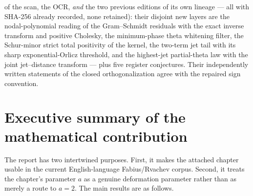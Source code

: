 \documentclass[11pt,oneside]{article}
\numberwithin{equation}{section}
\theoremstyle{definition}
\theoremstyle{remark}
\begin{document}
\begin{scopebox}
of the scan, the OCR, \emph{and} the two previous editions of its own
lineage --- all with SHA-256 already recorded, none retained): their
disjoint new layers are the nodal-polynomial reading of the
Gram--Schmidt residuals with the exact inverse transform and positive
Cholesky, the minimum-phase theta whitening filter, the Schur-minor
strict total positivity of the kernel, the two-term jet tail with its
sharp exponential-Orlicz threshold, and the highest-jet partial-theta
law with the joint jet--distance transform --- plus five register
conjectures.  Their independently written statements of the closed
orthogonalization agree with the repaired sign convention.
\end{scopebox}


\section{Executive summary of the mathematical contribution}

The report has two intertwined purposes.  First, it makes the attached chapter
usable in the current English-language Fabius/Rvachev corpus.  Second, it treats
the chapter's parameter $a$ as a genuine deformation parameter rather than as
merely a route to $a=2$.  The main results are as follows.
\end{document}

